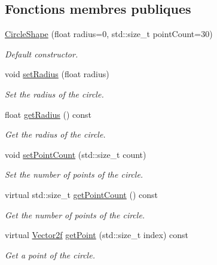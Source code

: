 \subsection*{Fonctions membres publiques}
\begin{DoxyCompactItemize}
\item 
\hyperlink{classsf_1_1CircleShape_aaebe705e7180cd55588eb19488af3af1}{Circle\+Shape} (float radius=0, std\+::size\+\_\+t point\+Count=30)
\begin{DoxyCompactList}\small\item\em Default constructor. \end{DoxyCompactList}\item 
void \hyperlink{classsf_1_1CircleShape_a21cdf85fc2f201e10222a241af864be0}{set\+Radius} (float radius)
\begin{DoxyCompactList}\small\item\em Set the radius of the circle. \end{DoxyCompactList}\item 
float \hyperlink{classsf_1_1CircleShape_aa3dd5a1b5031486ce5b6f09d43674aa3}{get\+Radius} () const
\begin{DoxyCompactList}\small\item\em Get the radius of the circle. \end{DoxyCompactList}\item 
void \hyperlink{classsf_1_1CircleShape_a16590ee7bdf5c9f752275468a4997bed}{set\+Point\+Count} (std\+::size\+\_\+t count)
\begin{DoxyCompactList}\small\item\em Set the number of points of the circle. \end{DoxyCompactList}\item 
virtual std\+::size\+\_\+t \hyperlink{classsf_1_1CircleShape_a014d29ec11e8afa4dce50e7047d99601}{get\+Point\+Count} () const
\begin{DoxyCompactList}\small\item\em Get the number of points of the circle. \end{DoxyCompactList}\item 
virtual \hyperlink{classsf_1_1Vector2}{Vector2f} \hyperlink{classsf_1_1CircleShape_a2d7f9715502b960b92387102fddb8736}{get\+Point} (std\+::size\+\_\+t index) const
\begin{DoxyCompactList}\small\item\em Get a point of the circle. \end{DoxyCompactList}\end{DoxyCompactItemize}
